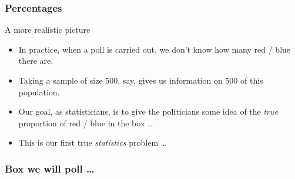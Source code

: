\documentclass[handout]{beamer}
\begin{document}

   \begin{frame} \frametitle{Percentages}

   \begin{block}
   {A more realistic picture}
   \begin{itemize}
   \item In practice, when a poll is carried out, we don't know
   how many {\color{red} red} / {\color{blue} blue} there are.

   \item Taking a sample of size 500, say, gives us
   information on 500 of this population.

   \item Our goal, as statisticians, is to give the politicians
   some idea of the {\em true} proportion of {\color{red} red} / {\color{blue} blue} in the box \dots

   \item This is our first true {\em statistics} problem \dots

   \end{itemize}
   \end{block}
   \end{frame}



   \begin{frame}
   \frametitle{Box we will poll \dots}
   \begin{center}
   \end{center}

   \end{frame}

\end{document}
